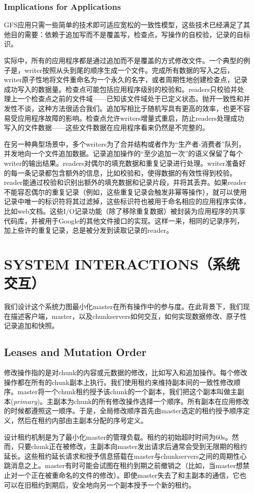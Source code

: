 \documentclass{article}
\begin{document}
\subsubsection{Implications for Applications}
GFS应用只需一些简单的技术即可适应宽松的一致性模型，这些技术已经满足了其他目的需要：依赖于追加写而不是覆盖写，检查点，写操作的自校验，记录的自标识。\par
实际中，所有的应用程序都是通过追加而不是覆盖的方式修改文件。一个典型的例子是，writer按照从头到尾的顺序生成一个文件。完成所有数据的写入之后，writer原子性地将文件重命名为一个永久的名字，或者周期性地创建检查点，记录成功写入的数据量。检查点可能包括应用程序级别的校验和。readers只校验并处理上一个检查点之前的文件域——已知该文件域处于已定义状态。抛开一致性和并发性不谈，这种方法很适合我们。追加写相比于随机写具有更高的效率，也更不容易受应用程序故障的影响。检查点允许writers增量式重启，防止readers处理成功写入的文件数据——这些文件数据在应用程序看来仍然是不完整的。\par
在另一种典型场景中，多个writers为了合并结构或者作为“生产者-消费者”队列，并发地向一个文件追加数据。记录追加操作的“至少追加一次”的语义保留了每个writer的输出结果。readers对偶尔的填充数据和重复记录进行处理。writer准备好的每一条记录都包含额外的信息，比如校验和，使得数据的有效性得到校验。reader能通过校验和识别出额外的填充数据和记录片段，并将其丢弃。如果reader不能容忍偶尔的重复记录（例如，这些重复记录会触发非幂等操作），就可以使用记录中唯一的标识符将其过滤掉，这些标识符也被用于命名相应的应用程序实体，比如web文档。这些I/O记录功能（除了移除重复数据）被封装为应用程序的共享代码库，并被用于Google的其他文件接口的实现。这样一来，相同的记录序列，加上些许的重复记录，总是被分发到读取记录的reader。

\section{SYSTEM INTERACTIONS（系统交互）}
我们设计这个系统力图最小化master在所有操作中的参与度。在此背景下，我们现在描述客户端，master，以及chunkservers如何交互，如何实现数据修改、原子性记录追加和快照。

\subsection{Leases and Mutation Order}
修改操作指的是对chunk的内容或元数据的修改，比如写入和追加操作。每个修改操作都在所有的chunk副本上执行。我们使用租约来维持副本间的一致性修改顺序。master将一个chunk租约授予该chunk的一个副本，我们把这个副本叫做主副本(\emph{primary})。主副本为chunk的所有修改操作选择一个顺序。所有副本在应用修改的时候都遵照这一顺序。于是，全局修改顺序首先由master选定的租约授予顺序定义，然后在租约内部由主副本分配的序号定义。\par
设计租约机制是为了最小化master的管理负载。租约的初始超时时间为60s。然而，只要chunk正在被修改，主副本向master发出请求后通常会受到无限期的租约延长。这些租约延长请求和授予信息搭载在master与chunkservers之间的周期性心跳消息之上。master有时可能会试图在租约到期之前撤销之（比如，当master想禁止对一个正在被重命名的文件的修改）。即使master失去了和主副本的通信，它也可以在旧租约到期后，安全地向另一个副本授予一个新的租约。
\end{document}
